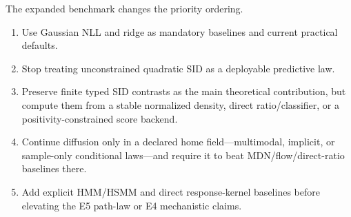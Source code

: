 The expanded benchmark changes the priority ordering.

\begin{enumerate}
  \item Use Gaussian NLL and ridge as mandatory baselines and current practical defaults.
  \item Stop treating unconstrained quadratic SID as a deployable predictive law.
  \item Preserve finite typed SID contrasts as the main theoretical contribution, but
        compute them from a stable normalized density, direct ratio/classifier, or a
        positivity-constrained score backend.
  \item Continue diffusion only in a declared home field---multimodal, implicit, or
        sample-only conditional laws---and require it to beat MDN/flow/direct-ratio
        baselines there.
  \item Add explicit HMM/HSMM and direct response-kernel baselines before elevating the
        E5 path-law or E4 mechanistic claims.
\end{enumerate}
